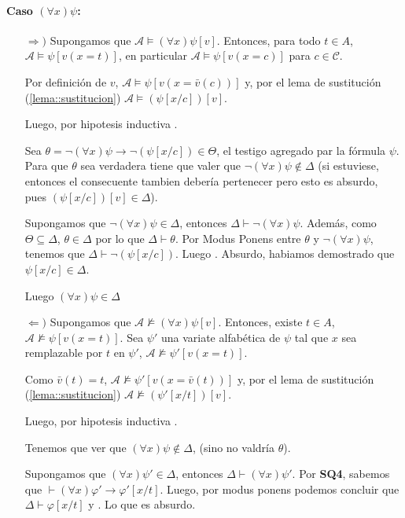 \begin{demoPart}
	\paragraph{Caso $(\forall x)\psi$:} 
	\begin{itemize}
		\item[$\bm{\Rightarrow})$] Supongamos que $\mathcal{A}\vDash(\forall x)\psi[v]$. Entonces, para todo $t\in A$, $\mathcal{A}\vDash\psi[v(x = t)]$, en particular $\mathcal{A}\vDash\psi[v(x = c)]$ para $c\in\mathcal{C}$. 
		
		Por definición de $v$, $\mathcal{A}\vDash\psi[v(x = \bar{v}(c))]$ y, por el lema de sustitución (\ref{lema::sustitucion}) $\mathcal{A}\vDash(\psi[x/c])[v]$.
		
		Luego, por hipotesis inductiva \red{$(\psi[x/c])[v]\in\Delta$}.
		
		Sea $\theta = \lnot(\forall x)\psi\to\lnot(\psi[x/c])\in\Theta$, el testigo agregado par la fórmula $\psi$. Para que $\theta$ sea verdadera tiene que valer que $\lnot(\forall x)\psi\notin\Delta$ (si estuviese, entonces el consecuente tambien debería pertenecer pero esto es absurdo, pues $(\psi[x/c])[v]\in\Delta$).
		\begin{center}
			\begin{minipage}{0.8\textwidth}
			Supongamos que $\lnot(\forall x)\psi\in\Delta$, entonces $\Delta\vdash\lnot(\forall x)\psi$. Además, como $\Theta\subseteq\Delta$, $\theta\in\Delta$ por lo que $\Delta\vdash\theta$. Por Modus Ponens entre $\theta$ y $\lnot(\forall x)\psi$, tenemos que $\Delta\vdash\lnot(\psi[x/c])$. Luego \red{$\lnot(\psi[x/c])\in\Delta$}. Absurdo, habiamos demostrado que $\psi[x/c]\in\Delta$.
		\end{minipage}
	\end{center}
Luego $(\forall x)\psi\in\Delta$
\item[$\bm{\Leftarrow})$]Supongamos que $\mathcal{A}\nvDash(\forall x)\psi[v]$. Entonces, existe $t\in A$, $\mathcal{A}\nvDash\psi[v(x = t)]$. Sea $\psi'$ una variate alfabética de $\psi$ tal que $x$ sea remplazable por $t$ en $\psi'$, $\mathcal{A}\nvDash\psi'[v(x = t)]$.


Como $\bar{v}(t) = t$, $\mathcal{A}\nvDash\psi'[v(x = \bar{v}(t))]$ y, por el lema de sustitución (\ref{lema::sustitucion}) $\mathcal{A}\nvDash(\psi'[x/t])[v]$.

Luego, por hipotesis inductiva .

Tenemos que ver que $(\forall x)\psi\notin\Delta$, (sino no valdría $\theta$). 
\begin{center}
	\begin{minipage}{0.8\textwidth}
		Supongamos que $(\forall x)\psi'\in\Delta$, entonces $\Delta\vdash(\forall x)\psi'$. Por \textbf{SQ4}, sabemos que $\vdash(\forall x)\varphi'\to\varphi'[x/t]$. Luego, por modus ponens podemos concluir que $\Delta\vdash\varphi[x/t]$ y . Lo que es absurdo.
	\end{minipage}
\end{center}


\end{itemize}
\end{demoPart}
